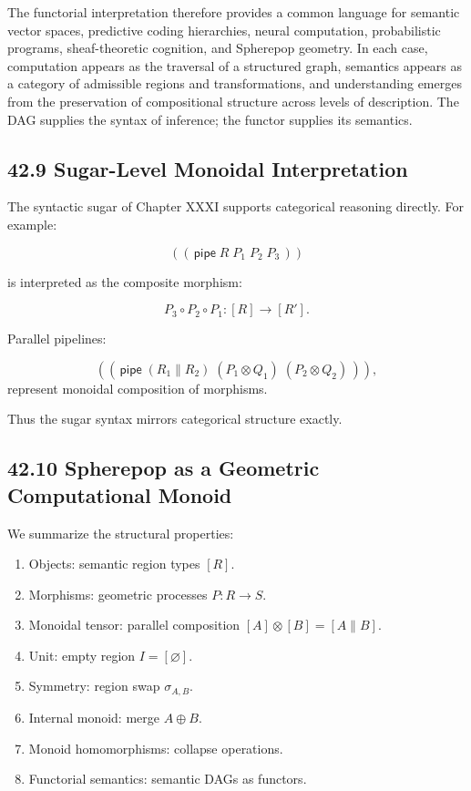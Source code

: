 \documentclass[12pt,letterpaper]{article}
\theoremstyle{remark}
\begin{document}
The functorial interpretation therefore provides a common language for semantic vector spaces, predictive coding hierarchies, neural computation, probabilistic programs, sheaf-theoretic cognition, and Spherepop geometry. In each case, computation appears as the traversal of a structured graph, semantics appears as a category of admissible regions and transformations, and understanding emerges from the preservation of compositional structure across levels of description. The DAG supplies the syntax of inference; the functor supplies its semantics.

\subsection{42.9 Sugar-Level Monoidal Interpretation}

The syntactic sugar of Chapter XXXI supports categorical reasoning directly. For example:

\[
((\,\mathsf{pipe}\; R\; P_1\; P_2\; P_3\,))
\]

is interpreted as the composite morphism:

\[
P_3 \circ P_2 \circ P_1 : [R] \to [R'].
\]

Parallel pipelines:

\[
((\,\mathsf{pipe}\; (R_1 \parallel R_2)\; (P_1 \otimes Q_1)\; (P_2 \otimes Q_2)\,)),
\]
represent monoidal composition of morphisms.

Thus the sugar syntax mirrors categorical structure exactly.

\subsection{42.10 Spherepop as a Geometric Computational Monoid}

We summarize the structural properties:

\begin{enumerate}
    \item Objects: semantic region types $[R]$.
    \item Morphisms: geometric processes $P : R \to S$.
    \item Monoidal tensor: parallel composition $[A] \otimes [B] = [A \parallel B]$.
    \item Unit: empty region $I = [\varnothing]$.
    \item Symmetry: region swap $\sigma_{A,B}$.
    \item Internal monoid: merge $A \oplus B$.
    \item Monoid homomorphisms: collapse operations.
    \item Functorial semantics: semantic DAGs as functors.
\end{enumerate}
\end{document}
